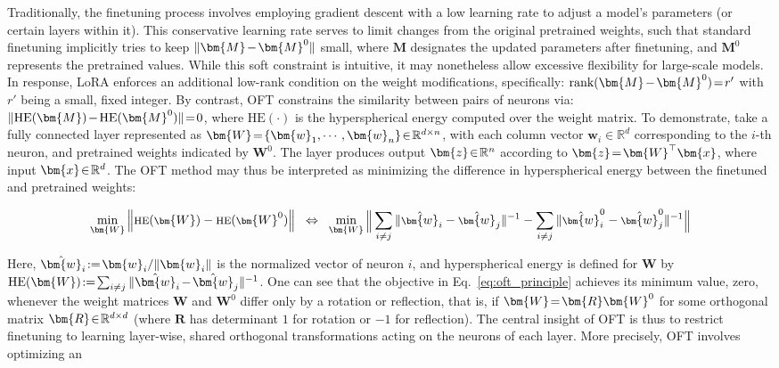 Traditionally, the finetuning process involves employing gradient descent with a low learning rate to adjust a model’s parameters (or certain layers within it). This conservative learning rate serves to limit changes from the original pretrained weights, such that standard finetuning implicitly tries to keep $\thickmuskip=2mu \medmuskip=2mu \| \bm{M} - \bm{M}^0\|$ small, where $\bm{M}$ designates the updated parameters after finetuning, and $\bm{M}^0$ represents the pretrained values. While this soft constraint is intuitive, it may nonetheless allow excessive flexibility for large-scale models. In response, LoRA enforces an additional low-rank condition on the weight modifications, specifically: $\thickmuskip=2mu \medmuskip=2mu \text{rank}(\bm{M} - \bm{M}^0)=r'$ with $r'$ being a small, fixed integer. By contrast, OFT constrains the similarity between pairs of neurons via: $\thickmuskip=2mu \medmuskip=2mu \| \text{HE}(\bm{M})-\text{HE}(\bm{M}^0) \|=0$, where $\text{HE}(\cdot)$ is the hyperspherical energy computed over the weight matrix. To demonstrate, take a fully connected layer represented as $\thickmuskip=2mu \medmuskip=2mu \bm{W}=\{\bm{w}_1,\cdots,\bm{w}_n\}\in\mathbb{R}^{d\times n}$, with each column vector $\bm{w}_i\in\mathbb{R}^{d}$ corresponding to the $i$-th neuron, and pretrained weights indicated by $\bm{W}^0$. The layer produces output $\thickmuskip=2mu \medmuskip=2mu \bm{z}\in\mathbb{R}^n$ according to $\thickmuskip=2mu \medmuskip=2mu \bm{z}=\bm{W}^\top\bm{x}$, where input $\thickmuskip=2mu \medmuskip=2mu \bm{x}\in\mathbb{R}^d$. The OFT method may thus be interpreted as minimizing the difference in hyperspherical energy between the finetuned and pretrained weights:

\begin{equation}\label{eq:oft_principle}
\footnotesize
\min_{\bm{W}} \left\| \text{HE}(\bm{W})-\text{HE}(\bm{W}^0)\right\|~~\Leftrightarrow~~\min_{\bm{W}} \bigg{\|} \sum_{i\neq j} \|\hat{\bm{w}}_i-\hat{\bm{w}}_j\|^{-1}-\sum_{i\neq j} \|\hat{\bm{w}}^0_i-\hat{\bm{w}}^0_j\|^{-1}\bigg{\|}
\end{equation}

Here, $\thickmuskip=2mu \medmuskip=2mu \hat{\bm{w}}_i:=\bm{w}_i/\|\bm{w}_i\|$ is the normalized vector of neuron $i$, and hyperspherical energy is defined for $\bm{W}$ by $\thickmuskip=2mu \medmuskip=2mu \text{HE}(\bm{W}):= \sum_{i\neq j} \|\hat{\bm{w}}_i-\hat{\bm{w}}_j\|^{-1}$. One can see that the objective in Eq.~\eqref{eq:oft_principle} achieves its minimum value, zero, whenever the weight matrices $\bm{W}$ and $\bm{W}^0$ differ only by a rotation or reflection, that is, if $\thickmuskip=2mu \medmuskip=2mu \bm{W}=\bm{R}\bm{W}^0$ for some orthogonal matrix $\thickmuskip=2mu \medmuskip=2mu \bm{R}\in\mathbb{R}^{d\times d}$ (where $\bm{R}$ has determinant $1$ for rotation or $-1$ for reflection). The central insight of OFT is thus to restrict finetuning to learning layer-wise, shared orthogonal transformations acting on the neurons of each layer. More precisely, OFT involves optimizing an


